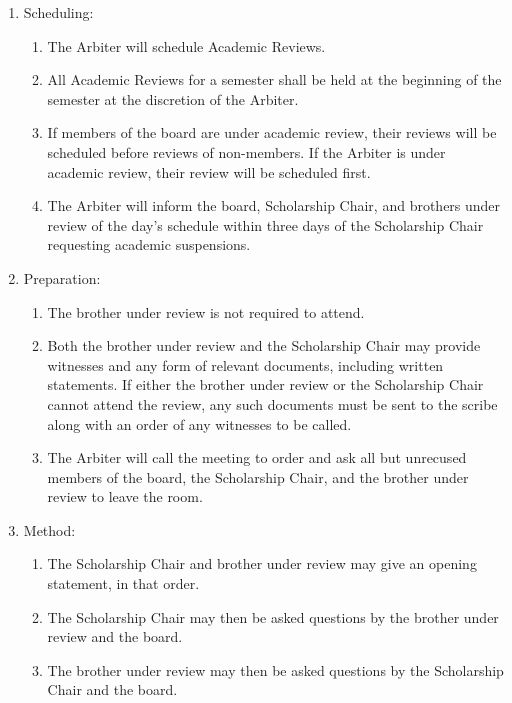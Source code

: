 \begin{enumerate}
			\begin{enumerate}
				\item  Scheduling:
				\begin{enumerate}
					\item The Arbiter will schedule Academic Reviews.
					\item All Academic Reviews for a semester shall be held at the beginning of the semester at the discretion of the Arbiter.
					\item If members of the board are under academic review, their reviews will be scheduled before reviews of non-members. If the Arbiter is under academic review, their review will be scheduled first.
					\item The Arbiter will inform the board, Scholarship Chair, and brothers under review of the day’s schedule within three days of the Scholarship Chair requesting academic suspensions.
				\end{enumerate}
				\item  Preparation:
				\begin{enumerate}
					\item The brother under review is not required to attend.
					\item Both the brother under review and the Scholarship Chair may provide witnesses and any form of relevant documents, including written statements. If either the brother under review or the Scholarship Chair cannot attend the review, any such documents must be sent to the scribe along with an order of any witnesses to be called.
					\item The Arbiter will call the meeting to order and ask all but unrecused members of the board, the Scholarship Chair, and the brother under review to leave the room.
				\end{enumerate}
				\item Method:
				\begin{enumerate}
					\item The Scholarship Chair and brother under review may give an opening statement, in that order.
					\item The Scholarship Chair may then be asked questions by the brother under review and the board.
					\item The brother under review may then be asked questions by the Scholarship Chair and the board.

\end{enumerate}
\end{enumerate}
\end{enumerate}
